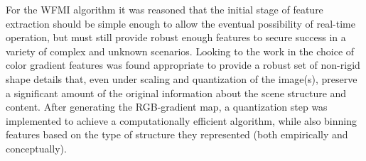 %
%
%
%
%
%
%
%
%

%
%
%



For the WFMI algorithm it was reasoned that the initial stage of feature extraction should be simple enough to allow the eventual possibility of real-time operation, but must still provide robust enough features to secure success in a variety of complex and unknown scenarios. Looking to the work in \cite{Ugarriza2009} the choice of color gradient features was found appropriate to provide a robust set of non-rigid shape details that, even under scaling and quantization of the image(s), preserve a significant amount of the original information about the scene structure and content. After generating the RGB-gradient map, a quantization step was implemented to achieve a computationally efficient algorithm, while also binning features based on the type of structure they represented (both empirically and conceptually).

